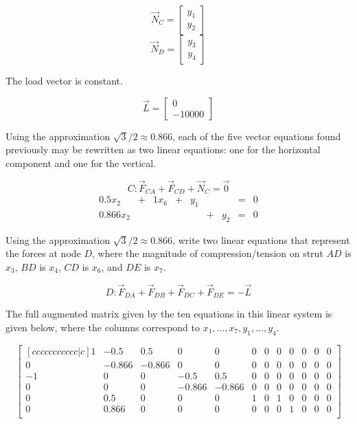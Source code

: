 \begin{applicationActivities}
\begin{observation}
\drawtruss{}

\[
\vec N_C=\begin{bmatrix}y_1\\y_2\end{bmatrix}
\]
\[
\vec N_D=\begin{bmatrix}y_3\\y_4\end{bmatrix}
\]

The load vector is constant.

\[
\vec L = \begin{bmatrix}0\\-10000\end{bmatrix}
\]

\end{observation}

\begin{remark}
Using the approximation \(\sqrt{3}/2\approx 0.866\), each of the five vector
equations found previously may be rewritten as two linear equations:
one for the horizontal component and one for the vertical.

\drawtruss{}

\[
C: \vec F_{CA}+\vec F_{CD}+\vec N_C=\vec 0
\]
\begin{alignat*}{5}
0.5x_2   &+& 1x_6 &+& y_1 &&      &=& 0\\
0.866x_2 &&       &&      &+& y_2 &=& 0
\end{alignat*}
\end{remark}

\begin{activity}{10}
Using the approximation \(\sqrt{3}/2\approx 0.866\),
write two linear equations that represent the forces at node \(D\),
where the magnitude of compression/tension on strut \(AD\) is \(x_3\),
\(BD\) is \(x_4\), \(CD\) is \(x_6\), and \(DE\) is \(x_7\).

\drawtruss{}

\[
D:\vec F_{DA}+\vec F_{DB}+\vec F_{DC}+\vec F_{DE}=-\vec L
\]

\end{activity}

\begin{observation}
The full augmented matrix given by the ten equations in this linear system
is given below, where the columns correspond to \(x_1,\dots,x_7,y_1,\dots,y_4\).

\drawtruss{}

\[
\begin{bmatrix}[ccccccccccc|c]
1&-0.5&0.5&0&0&0&0&0&0&0&0&0\\
0&-0.866&-0.866&0&0&0&0&0&0&0&0&0\\
-1&0&0&-0.5&0.5&0&0&0&0&0&0&0\\
0&0&0&-0.866&-0.866&0&0&0&0&0&0&0\\
0&0.5&0&0&0&1&0&1&0&0&0&0\\
0&0.866&0&0&0&0&0&0&1&0&0&0\\
\end{bmatrix}
\]
\end{observation}


\end{applicationActivities}

